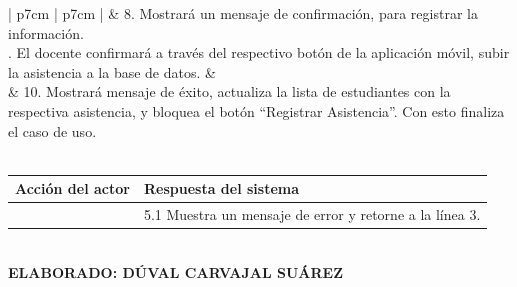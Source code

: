 \begin{table}[h!]
	\begin{tabular}{| p{7cm} | p{7cm} |}
		\hline
		&  8. Mostrará un mensaje de confirmación, para registrar la información. \\ . El docente confirmará a través del respectivo botón de la aplicación móvil, subir la asistencia a la base de datos. & \\ \hline
		& 10. Mostrará mensaje de éxito, actualiza la lista de estudiantes con la respectiva asistencia, y bloquea el botón “Registrar Asistencia”. Con esto finaliza el caso de uso. \\ \hline
		 \\ \hline
	\end{tabular}
	\begin{tabular}{| p{7cm} | p{7cm} |}
		\textbf{Acción del actor} & \textbf{Respuesta del sistema} \\ \hline	
		& 5.1 Muestra un mensaje de error y retorne a la línea 3.    \\ \hline
	\end{tabular}
	\textbf{ \\ ELABORADO: DÚVAL CARVAJAL SUÁREZ}
\end{table}

